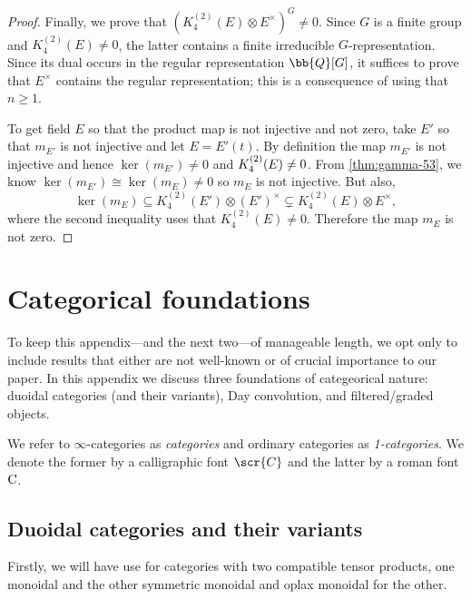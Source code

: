 \documentclass[a4paper]{amsart}
\begin{document}
\begin{proof}
Finally, we prove that $(K_4^{(2)}(E) \otimes E^\times)^G \neq 0$. Since $G$ is a finite group and $K_4^{(2)}(E) \neq 0$, the latter contains a finite irreducible $G$-representation. Since its dual occurs in the regular representation $\bb{Q}[G]$, it suffices to prove that $E^\times$ contains the regular representation; this is a consequence of \cite[Proposition 19]{BDEPS} using that $n \geq 1$.

\medskip

To get field $E$ so that the product map is not injective and not zero, take $E'$ so that $m_{E'}$ is not injective and let $E=E'(t)$. By definition the map $m_{E'}$ is not injective and hence $\ker(m_{E'}) \neq 0$ and $\smash{K_4^{(2)}(E)}\neq 0$. From \cref{thm:gamma-53}, we know $\ker(m_{E'}) \cong \ker(m_E) \neq 0$ so $m_{E}$ is not injective. But also, 
\[\ker(m_{E}) \subseteq K_4^{(2)}(E') \otimes (E')^\times \subsetneq K_4^{(2)}(E) \otimes E^\times,\]
where the second inequality uses that $K_4^{(2)}(E) \neq 0$. 
Therefore the map $m_{E}$ is not zero.
\end{proof}








\appendix

\section{Categorical foundations} To keep this appendix---and the next two---of manageable length, we opt only to include results that either are not well-known or of crucial importance to our paper. In this appendix we discuss three foundations of categeorical nature: duoidal categories (and their variants), Day convolution, and filtered/graded objects.

\begin{convention}We refer to $\infty$-categories as \emph{categories} and ordinary categories as \emph{1-categories}. We denote the former by a calligraphic font $\scr{C}$ and the latter by a roman font $\rm{C}$.
\end{convention}

\subsection{Duoidal categories and their variants} Firstly, we will have use for categories with two compatible tensor products, one monoidal and the other symmetric monoidal and oplax monoidal for the other. 
\end{document}
